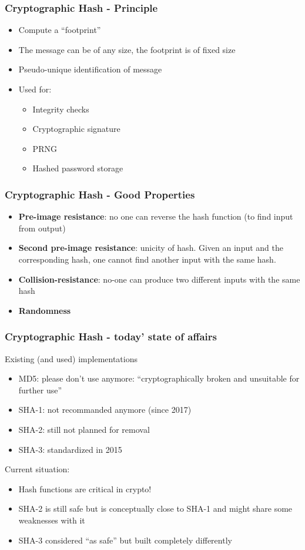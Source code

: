 \documentclass[
hyperref={pdfpagelabels=false}
,xcolor=table
]
{beamer}
\begin{document}
\begin{frame}
  \frametitle{Cryptographic Hash - Principle}

  \begin{itemize}
  \item Compute a ``footprint''
  \item The message can be of any size, the footprint is of fixed size
  \item Pseudo-unique identification of message
  \item Used for:
    \begin{itemize}
    \item Integrity checks
    \item Cryptographic signature
    \item PRNG
    \item Hashed password storage
    \end{itemize}
  \end{itemize}
\end{frame}


\begin{frame}
  \frametitle{Cryptographic Hash - Good Properties}

  \begin{itemize}
  \item \textbf{Pre-image resistance}: no one can reverse the hash function (to find input from output)
  \item \textbf{Second pre-image resistance}: unicity of hash. Given an input and the corresponding hash, one cannot find another input with the same hash. 
  \item \textbf{Collision-resistance}: no-one can produce two different inputs with the same hash
  \item \textbf{Randomness}
  \end{itemize}
\end{frame}


\begin{frame}
  \frametitle{Cryptographic Hash - today' state of affairs}

  Existing (and used) implementations
  \begin{itemize}
  \item MD5: please don't use anymore: ``cryptographically broken and
    unsuitable for further use''
  \item SHA-1: not recommanded anymore (since 2017)
  \item SHA-2: still not planned for removal
  \item SHA-3: standardized in 2015
  \end{itemize}

  Current situation:
  \begin{itemize}
  \item Hash functions are critical in crypto!
  \item SHA-2 is still safe but is conceptually close to SHA-1 and might share some weaknesses with it
  \item SHA-3 considered ``as safe'' but built completely differently
  \end{itemize}
\end{frame}
\end{document}

